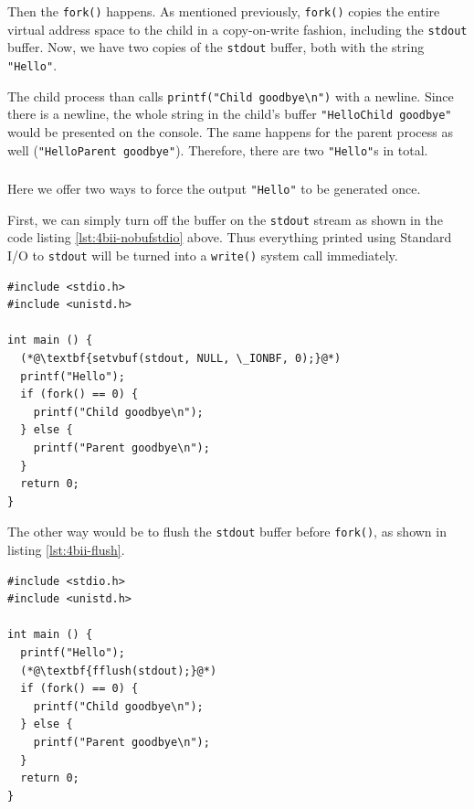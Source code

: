 \documentclass[12pt]{article}
\begin{document}
Then the \texttt{fork()} happens. As mentioned previously, \texttt{fork()} copies the entire virtual address space to the child in a copy-on-write fashion, including the \texttt{stdout} buffer. Now, we have two copies of the \texttt{stdout} buffer, both with the string \texttt{"Hello"}.

The child process than calls \texttt{printf("Child goodbye\textbackslash n")} with a newline. Since there is a newline, the whole string in the child's buffer \texttt{"HelloChild goodbye"} would be presented on the console. The same happens for the parent process as well (\texttt{"HelloParent goodbye"}). Therefore, there are two \texttt{"Hello"}s in total.

\subsubsection{}

Here we offer two ways to force the output \texttt{"Hello"} to be generated once.

First, we can simply turn off the buffer on the \texttt{stdout} stream as shown in the code listing \ref{lst:4bii-nobufstdio} above. Thus everything printed using Standard I/O to \texttt{stdout} will be turned into a \texttt{write()} system call immediately. 

\begin{lstlisting}[style=C++, label={lst:4bii-nobufstdio}, caption={Turn off buffer for \texttt{stdout}},captionpos=b]
#include <stdio.h>
#include <unistd.h>

int main () {
  (*@\textbf{setvbuf(stdout, NULL, \_IONBF, 0);}@*)
  printf("Hello");
  if (fork() == 0) {
    printf("Child goodbye\n");
  } else {
    printf("Parent goodbye\n");
  }
  return 0;
}
\end{lstlisting}

The other way would be to flush the \texttt{stdout} buffer before \texttt{fork()}, as shown in listing \ref{lst:4bii-flush}.

\begin{lstlisting}[style=C++, label={lst:4bii-flush}, caption={Flush the \texttt{stdout} buffer before \texttt{fork}},captionpos=b]
#include <stdio.h>
#include <unistd.h>

int main () {
  printf("Hello");
  (*@\textbf{fflush(stdout);}@*)
  if (fork() == 0) {
    printf("Child goodbye\n");
  } else {
    printf("Parent goodbye\n");
  }
  return 0;
}
\end{lstlisting}


\newpage
\section{}
\end{document}
